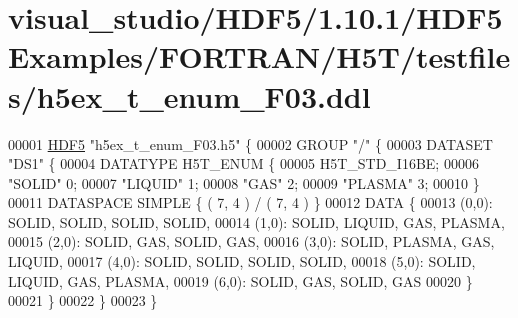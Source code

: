\hypertarget{visual__studio_2_h_d_f5_21_810_81_2_h_d_f5_examples_2_f_o_r_t_r_a_n_2_h5_t_2testfiles_2h5ex__t__enum___f03_8ddl_source}{}\section{visual\+\_\+studio/\+H\+D\+F5/1.10.1/\+H\+D\+F5\+Examples/\+F\+O\+R\+T\+R\+A\+N/\+H5\+T/testfiles/h5ex\+\_\+t\+\_\+enum\+\_\+\+F03.ddl}
\label{visual__studio_2_h_d_f5_21_810_81_2_h_d_f5_examples_2_f_o_r_t_r_a_n_2_h5_t_2testfiles_2h5ex__t__enum___f03_8ddl_source}

\begin{DoxyCode}
00001 \hyperlink{namespace_h_d_f5}{HDF5} \textcolor{stringliteral}{"h5ex\_t\_enum\_F03.h5"} \{
00002 GROUP \textcolor{stringliteral}{"/"} \{
00003    DATASET \textcolor{stringliteral}{"DS1"} \{
00004       DATATYPE  H5T\_ENUM \{
00005          H5T\_STD\_I16BE;
00006          \textcolor{stringliteral}{"SOLID"}            0;
00007          \textcolor{stringliteral}{"LIQUID"}           1;
00008          \textcolor{stringliteral}{"GAS"}              2;
00009          \textcolor{stringliteral}{"PLASMA"}           3;
00010       \}
00011       DATASPACE  SIMPLE \{ ( 7, 4 ) / ( 7, 4 ) \}
00012       DATA \{
00013       (0,0): SOLID, SOLID, SOLID, SOLID,
00014       (1,0): SOLID, LIQUID, GAS, PLASMA,
00015       (2,0): SOLID, GAS, SOLID, GAS,
00016       (3,0): SOLID, PLASMA, GAS, LIQUID,
00017       (4,0): SOLID, SOLID, SOLID, SOLID,
00018       (5,0): SOLID, LIQUID, GAS, PLASMA,
00019       (6,0): SOLID, GAS, SOLID, GAS
00020       \}
00021    \}
00022 \}
00023 \}
\end{DoxyCode}
